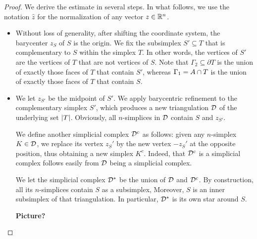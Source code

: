\documentclass[10pt,a4paper]{article}
\newcommand{\todo}[1]{{\color{RedOrange}\textbf{#1}}}
\begin{document}
\begin{proof}
    We derive the estimate in several steps. 
    In what follows, we use the notation $\hat z$ for the normalization of any vector $z \in {\mathbb R}^{n}$.
    \begin{itemize}
        \item 
        Without loss of generality, after shifting the coordinate system, the barycenter $z_{S}$ of $S$ is the origin. 
        We fix the subsimplex $S' \subseteq T$ that is complementary to $S$ within the simplex $T$. 
        In other words, the vertices of $S'$ are the vertices of $T$ that are not vertices of $S$. 
        Note that ${\Gamma_2} \subseteq \partial T$ is the union of exactly those faces of $T$ that contain $S'$,
        whereas ${\Gamma_1} = A \cap T$ is the union of exactly those faces of $T$ that contain $S$. 
        
        
        \item 
        We let $z_{S'}$ be the midpoint of $S'$. 
        We apply barycentric refinement to the complementary simplex $S'$, which produces a new triangulation ${\mathcal D}$ of the underlying set $\left| T \right|$. 
        Obviously, all $n$-simplices in ${\mathcal D}$ contain $S$ and $z_{S'}$.
        
        We define another simplicial complex ${\mathcal D}^c$ as follows:
        given any $n$-simplex $K \in {\mathcal D}$, 
        we replace its vertex $z_{S}'$ by the new vertex $-z_{S}'$ at the opposite position,
        thus obtaining a new simplex $K^{c}$. 
        Indeed, that ${\mathcal D}^c$ is a simplicial complex follows easily from ${\mathcal D}$ being a simplicial complex. 
        
        We let the simplicial complex ${\mathcal D}^\ast$ be the union of ${\mathcal D}$ and ${\mathcal D}^c$. 
        By construction, all its $n$-simplices contain $S$ as a subsimplex,
        Moreover, $S$ is an inner subsimplex of that triangulation. 
        In particular, ${\mathcal D}^\ast$ is its own star around $S$.
        
        \todo{Picture?}
        
        

\end{itemize}
\end{proof}
\end{document}
